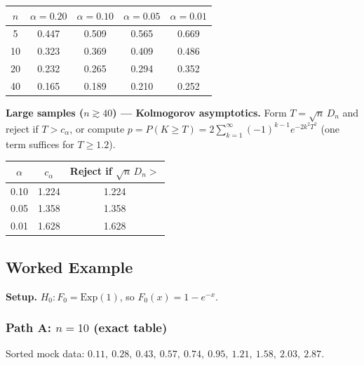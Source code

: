 \documentclass[11pt, a4paper]{article}
\begin{document}
\begin{center}
\begin{tabular}{ccccc}
\toprule
$n$ & $\alpha=0.20$ & $\alpha=0.10$ & $\alpha=0.05$ & $\alpha=0.01$ \\
\midrule
 5 & 0.447 & 0.509 & 0.565 & 0.669 \\
10 & 0.323 & 0.369 & 0.409 & 0.486 \\
20 & 0.232 & 0.265 & 0.294 & 0.352 \\
40 & 0.165 & 0.189 & 0.210 & 0.252 \\
\bottomrule
\end{tabular}
\end{center}

\textbf{Large samples ($n\gtrsim 40$) --- Kolmogorov asymptotics.}
Form $T=\sqrt{n}\,D_n$ and reject if $T>c_\alpha$, or compute
$p = P(K\geq T)= 2\sum_{k=1}^{\infty}(-1)^{k-1}e^{-2k^2T^2}$
(one term suffices for $T\geq 1.2$).

\begin{center}
\begin{tabular}{ccc}
\toprule
$\alpha$ & $c_\alpha$ & Reject if $\sqrt{n}\,D_n>$ \\
\midrule
0.10 & 1.224 & 1.224 \\
0.05 & 1.358 & 1.358 \\
0.01 & 1.628 & 1.628 \\
\bottomrule
\end{tabular}
\end{center}

\subsection{Worked Example}

\textbf{Setup.} $H_0\colon F_0=\mathrm{Exp}(1)$, so $F_0(x)=1-e^{-x}$.

\subsubsection*{Path A: $n=10$ (exact table)}

Sorted mock data: $0.11,\ 0.28,\ 0.43,\ 0.57,\ 0.74,\ 0.95,\ 1.21,\ 1.58,\ 2.03,\ 2.87$.
\end{document}
